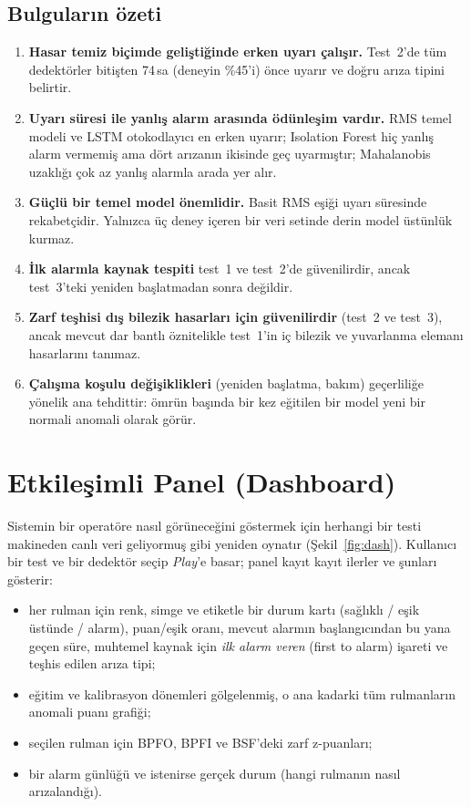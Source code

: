 \documentclass[11pt]{article}
\begin{document}
\subsection{Bulguların özeti}
\begin{enumerate}
  \item \textbf{Hasar temiz biçimde geliştiğinde erken uyarı çalışır.} Test~2'de tüm dedektörler
        bitişten 74\,sa (deneyin \%45'i) önce uyarır ve doğru arıza tipini belirtir.
  \item \textbf{Uyarı süresi ile yanlış alarm arasında ödünleşim vardır.} RMS temel modeli ve LSTM
        otokodlayıcı en erken uyarır; Isolation Forest hiç yanlış alarm vermemiş ama dört arızanın
        ikisinde geç uyarmıştır; Mahalanobis uzaklığı çok az yanlış alarmla arada yer alır.
  \item \textbf{Güçlü bir temel model önemlidir.} Basit RMS eşiği uyarı süresinde rekabetçidir. Yalnızca
        üç deney içeren bir veri setinde derin model üstünlük kurmaz.
  \item \textbf{İlk alarmla kaynak tespiti} test~1 ve test~2'de güvenilirdir, ancak test~3'teki yeniden
        başlatmadan sonra değildir.
  \item \textbf{Zarf teşhisi dış bilezik hasarları için güvenilirdir} (test~2 ve test~3), ancak mevcut
        dar bantlı öznitelikle test~1'in iç bilezik ve yuvarlanma elemanı hasarlarını tanımaz.
  \item \textbf{Çalışma koşulu değişiklikleri} (yeniden başlatma, bakım) geçerliliğe yönelik ana
        tehdittir: ömrün başında bir kez eğitilen bir model yeni bir normali anomali olarak görür.
\end{enumerate}

\section{Etkileşimli Panel (Dashboard)}
Sistemin bir operatöre nasıl görüneceğini göstermek için  herhangi bir testi
makineden canlı veri geliyormuş gibi yeniden oynatır (Şekil~\ref{fig:dash}). Kullanıcı bir test ve bir
dedektör seçip \emph{Play}'e basar; panel kayıt kayıt ilerler ve şunları gösterir:
\begin{itemize}
  \item her rulman için renk, simge ve etiketle bir durum kartı (sağlıklı / eşik üstünde / alarm),
        puan/eşik oranı, mevcut alarmın başlangıcından bu yana geçen süre, muhtemel kaynak için
        \emph{ilk alarm veren} (first to alarm) işareti ve teşhis edilen arıza tipi;
  \item eğitim ve kalibrasyon dönemleri gölgelenmiş, o ana kadarki tüm rulmanların anomali puanı
        grafiği;
  \item seçilen rulman için BPFO, BPFI ve BSF'deki zarf z-puanları;
  \item bir alarm günlüğü ve istenirse gerçek durum (hangi rulmanın nasıl arızalandığı).
\end{itemize}
\end{document}

